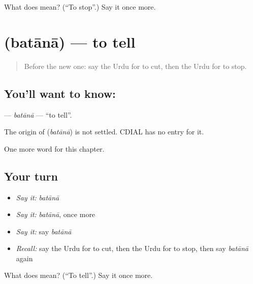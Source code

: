 \begin{tcolorbox}[breakable,colback=teal!4,colframe=teal!35!black,title={Before you move on}]
What does  mean? (\textquotedblleft{}To stop\textquotedblright{}.) Say it once more.
\end{tcolorbox}
\section[\texorpdfstring{\ur{بتانا} (batānā)}{بتانا (batānā)}]{ (batānā) — to tell}

\label{lesson:UR-C52-batana}



\begin{quote}
Before the new one: say the Urdu for to cut, then the Urdu for to stop.
\end{quote}

\subsection*{You'll want to know: }
\textbf{} — \emph{batānā} — \textquotedblleft{}to tell\textquotedblright{}.

\begin{cousinweb}
The origin of \textbf{} (\emph{batānā}) is not settled. CDIAL has no entry for it.
\end{cousinweb}

\begin{grammarlens}[title={What you've built}]
One more word for this chapter.
\end{grammarlens}

\subsection*{Your turn}
\begin{itemize}
\raggedright
  \item \emph{Say it:} \emph{batānā}
  \item \emph{Say it:} \emph{batānā}, once more
  \item \emph{Say it:} say \emph{batānā}
  \item \emph{Recall:} say the Urdu for to cut, then the Urdu for to stop, then say \emph{batānā} again
\end{itemize}

\begin{tcolorbox}[breakable,colback=teal!4,colframe=teal!35!black,title={Before you move on}]
What does  mean? (\textquotedblleft{}To tell\textquotedblright{}.) Say it once more.
\end{tcolorbox}
